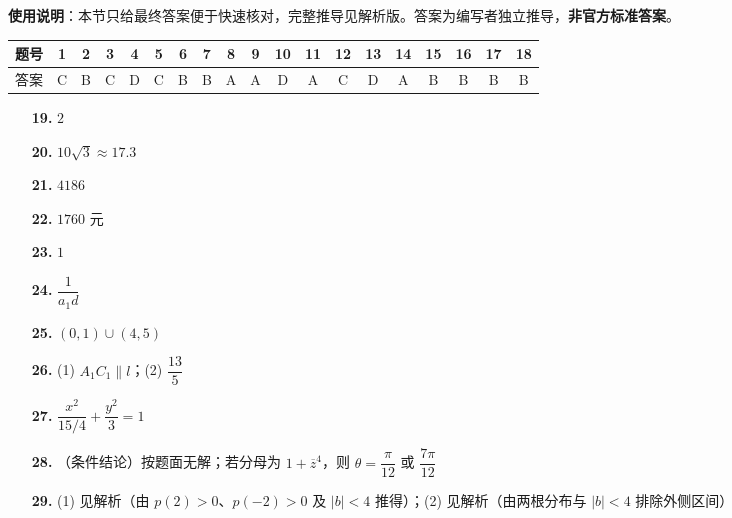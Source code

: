 
\begin{gknotice}
\textbf{使用说明}：本节只给最终答案便于快速核对，完整推导见解析版。答案为编写者独立推导，\textbf{非官方标准答案}。
\end{gknotice}

\begin{center}\begin{tabular}{ccccccccccccccccccc}
\toprule
题号 & 1 & 2 & 3 & 4 & 5 & 6 & 7 & 8 & 9 & 10 & 11 & 12 & 13 & 14 & 15 & 16 & 17 & 18 \\
\midrule
答案 & C & B & C & D & C & B & B & A & A & D & A & C & D & A & B & B & B & B \\
\bottomrule
\end{tabular}\end{center}

\begin{itemize}[leftmargin=2.6em]
  \item[\textbf{19.}] \(2\)
  \item[\textbf{20.}] \(10\sqrt3\approx17.3\)
  \item[\textbf{21.}] \(4186\)
  \item[\textbf{22.}] \(1760\) 元
  \item[\textbf{23.}] \(1\)
  \item[\textbf{24.}] \(\dfrac{1}{a_1d}\)
\end{itemize}

\begin{itemize}[leftmargin=2.6em]
  \item[\textbf{25.}] \((0,1)\cup(4,5)\)
  \item[\textbf{26.}] (1) \(A_1C_1\parallel l\)；(2) \(\dfrac{13}{5}\)
  \item[\textbf{27.}] \(\dfrac{x^2}{15/4}+\dfrac{y^2}{3}=1\)
  \item[\textbf{28.}] （条件结论）按题面无解；若分母为 \(1+\overline z^4\)，则 \(\theta=\dfrac{\pi}{12}\) 或 \(\dfrac{7\pi}{12}\)
  \item[\textbf{29.}] (1) 见解析（由 \(p(2)>0\)、\(p(-2)>0\) 及 \(|b|<4\) 推得）；(2) 见解析（由两根分布与 \(|b|<4\) 排除外侧区间）
\end{itemize}
